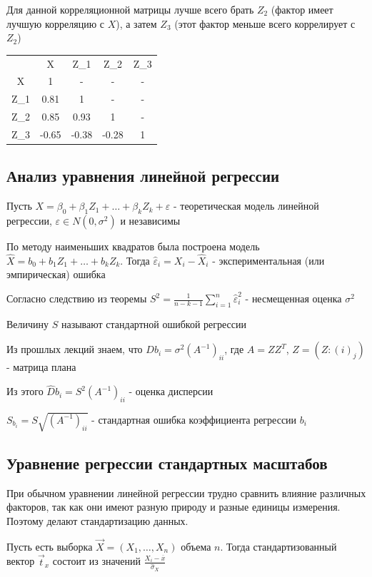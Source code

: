 \documentclass[12pt]{article}
\begin{document}
\Ex Для данной корреляционной матрицы лучше всего брать $Z_2$ (фактор имеет лучшую корреляцию с $X$), 
а затем $Z_3$ (этот фактор меньше всего коррелирует с $Z_2$)

\begin{tabular}{c|c|c|c|c}
    & X & Z_1 & Z_2 & Z_3 \\
    X & 1 & - & - & - \\
    Z_1 & 0.81 & 1 & - & - \\
    Z_2 & 0.85 & 0.93 & 1 & - \\
    Z_3 & -0.65 & -0.38 & -0.28 & 1
\end{tabular}

\subsection{Анализ уравнения линейной регрессии}

Пусть $X = \beta_0 + \beta_1 Z_1 + \dots + \beta_k Z_k + \varepsilon$ - теоретическая модель линейной регрессии, $\varepsilon \in N(0, \sigma^2)$ и независимы

По методу наименьших квадратов была построена модель $\hat X = b_0 + b_1 Z_1 + \dots + b_k Z_k$. Тогда $\hat \varepsilon_i = X_i - \hat X_i$ - экспериментальная (или эмпирическая) ошибка

Согласно следствию из теоремы $S^2 = \frac{1}{n - k - 1} \sum_{i = 1}^n \hat \varepsilon_i^2$ - несмещенная оценка $\sigma^2$

\Def Величину $S$ называют стандартной ошибкой регрессии 

Из прошлых лекций знаем, что $D b_i = \sigma^2 (A^{-1})_{ii}$, где $A = Z Z^T$, $Z = (Z:{(i)}_j)$ - матрица плана

Из этого $\hat D b_i = S^2 (A^{-1})_{ii}$ - оценка дисперсии

\Def $S_{b_i} = S \sqrt{(A^{-1})_{ii}}$ - стандартная ошибка коэффициента регрессии $b_i$

\subsection{Уравнение регрессии стандартных масштабов}

\Nota При обычном уравнении линейной регрессии трудно сравнить влияние различных факторов, так как они имеют 
разную природу и разные единицы измерения. Поэтому делают стандартизацию данных. 

Пусть есть выборка $\vec X = (X_1, \dots, X_n)$ объема $n$. Тогда стандартизованный вектор $\vec t_x$ состоит из значений $\frac{X_i - \overline{x}}{\hat \sigma_X}$
\end{document}
